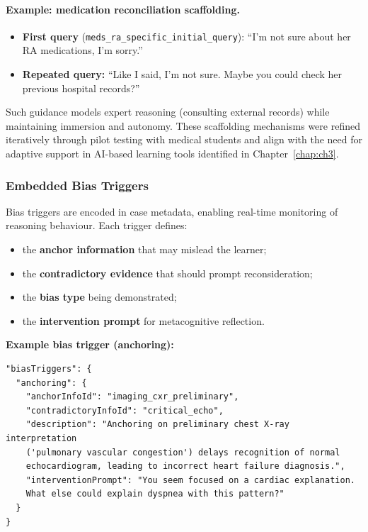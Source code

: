 \paragraph{Example: medication reconciliation scaffolding.}

\begin{itemize}
  \item \textbf{First query}
  (\texttt{meds\_ra\_specific\_initial\_query}): ``I'm not sure about her RA
  medications, I'm sorry.''
  \item \textbf{Repeated query:} ``Like I said, I'm not sure. Maybe you could check her
  previous hospital records?''
\end{itemize}

Such guidance models expert reasoning (consulting external records)
while maintaining immersion and autonomy.
These scaffolding mechanisms were refined iteratively through pilot testing
with medical students and align with the need for adaptive support in
AI-based learning tools identified in Chapter~\ref{chap:ch3}.

\subsubsection{Embedded Bias Triggers}

Bias triggers are encoded in case metadata, enabling real-time monitoring of
reasoning behaviour.
Each trigger defines:

\begin{itemize}
  \item the \textbf{anchor information} that may mislead the learner;
  \item the \textbf{contradictory evidence} that should prompt reconsideration;
  \item the \textbf{bias type} being demonstrated;
  \item the \textbf{intervention prompt} for metacognitive reflection.
\end{itemize}

\noindent
\textbf{Example bias trigger (anchoring):}

\begin{verbatim}
"biasTriggers": {
  "anchoring": {
    "anchorInfoId": "imaging_cxr_preliminary",
    "contradictoryInfoId": "critical_echo",
    "description": "Anchoring on preliminary chest X-ray interpretation
    ('pulmonary vascular congestion') delays recognition of normal
    echocardiogram, leading to incorrect heart failure diagnosis.",
    "interventionPrompt": "You seem focused on a cardiac explanation.
    What else could explain dyspnea with this pattern?"
  }
}
\end{verbatim}

